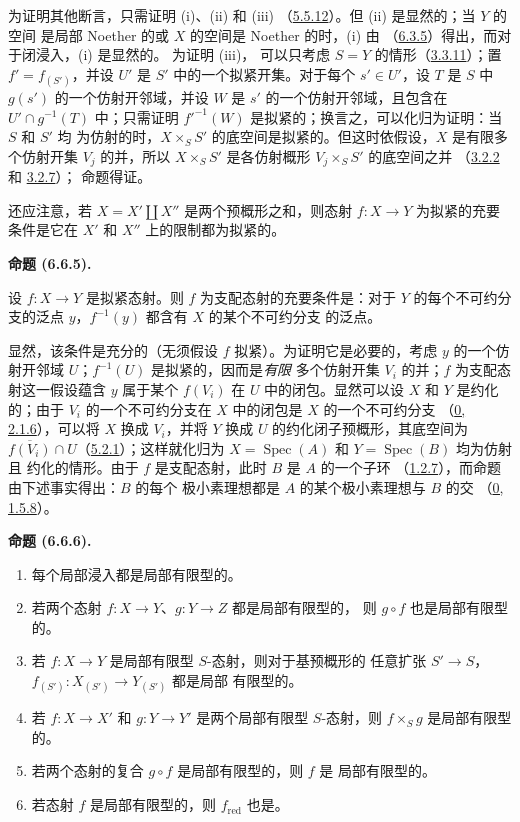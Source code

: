 \documentclass[UTF8,fontset=none,11pt,oneside,openany]{ctexbook}
\newenvironment{proposition}[1][]{%
  \par\medskip\noindent\textbf{命题 (#1).}\ %
}{\par}
\newcommand{\oldpage}[2][]{%
  \hypertarget{ega-source-page-#1-#2}{}%
  \marginnote{\scriptsize\textbf{#1}~|~#2}\ignorespaces}
\let\EGAOriginalLabel\label
\renewcommand{\label}[1]{\phantomsection\EGAOriginalLabel{#1}}
\begin{document}
为证明其他断言，只需证明 (i)、(ii) 和 (iii)
（\hyperref[I.5.5.12-fr]{5.5.12}）。但 (ii) 是显然的；当 $Y$ 的空间
是局部 Noether 的或 $X$ 的空间是 Noether 的时，(i) 由
（\hyperref[I.6.3.5-fr]{6.3.5}）得出，而对于闭浸入，(i) 是显然的。
为证明 (iii)，
\oldpage[I]{154}
可以只考虑 $S=Y$ 的情形（\hyperref[I.3.3.11-fr]{3.3.11}）；置
$f'=f_{(S')}$，并设 $U'$ 是 $S'$ 中的一个拟紧开集。对于每个
$s'\in U'$，设 $T$ 是 $S$ 中 $g(s')$ 的一个仿射开邻域，并设 $W$
是 $s'$ 的一个仿射开邻域，且包含在 $U'\cap g^{-1}(T)$ 中；只需证明
$f'^{-1}(W)$ 是拟紧的；换言之，可以化归为证明：当 $S$ 和 $S'$ 均
为仿射的时，$X\times_S S'$ 的底空间是拟紧的。但这时依假设，$X$
是有限多个仿射开集 $V_j$ 的并，所以 $X\times_S S'$ 是各仿射概形
$V_j\times_S S'$ 的底空间之并
（\hyperref[I.3.2.2-fr]{3.2.2} 和 \hyperref[I.3.2.7-fr]{3.2.7}）；
命题得证。

还应注意，若 $X=X'\amalg X''$ 是两个预概形之和，则态射 $f:X\to Y$
为拟紧的充要条件是它在 $X'$ 和 $X''$ 上的限制都为拟紧的。

\begin{proposition}[6.6.5]
\label{I.6.6.5-fr}
设 $f:X\to Y$ 是拟紧态射。则 $f$ 为支配态射的充要条件是：对于 $Y$
的每个不可约分支的泛点 $y$，$f^{-1}(y)$ 都含有 $X$ 的某个不可约分支
的泛点。
\end{proposition}

显然，该条件是充分的（无须假设 $f$ 拟紧）。为证明它是必要的，考虑
$y$ 的一个仿射开邻域 $U$；$f^{-1}(U)$ 是拟紧的，因而是\emph{有限}
多个仿射开集 $V_i$ 的并；$f$ 为支配态射这一假设蕴含 $y$ 属于某个
$f(V_i)$ 在 $U$ 中的闭包。显然可以设 $X$ 和 $Y$ 是约化的；由于
$V_i$ 的一个不可约分支在 $X$ 中的闭包是 $X$ 的一个不可约分支
（\hyperref[0.2.1.6-fr]{0, 2.1.6}），可以将 $X$ 换成 $V_i$，并将 $Y$
换成 $U$ 的约化闭子预概形，其底空间为
$\overline{f(V_i)}\cap U$（\hyperref[I.5.2.1-fr]{5.2.1}）；这样就化归为
$X=\operatorname{Spec}(A)$ 和 $Y=\operatorname{Spec}(B)$ 均为仿射且
约化的情形。由于 $f$ 是支配态射，此时 $B$ 是 $A$ 的一个子环
（\hyperref[I.1.2.7-fr]{1.2.7}），而命题由下述事实得出：$B$ 的每个
极小素理想都是 $A$ 的某个极小素理想与 $B$ 的交
（\hyperref[0.1.5.8-fr]{0, 1.5.8}）。

\begin{proposition}[6.6.6]
\label{I.6.6.6-fr}
\begin{enumerate}
  \item[(i)] 每个局部浸入都是局部有限型的。
  \item[(ii)] 若两个态射 $f:X\to Y$、$g:Y\to Z$ 都是局部有限型的，
    则 $g\circ f$ 也是局部有限型的。
  \item[(iii)] 若 $f:X\to Y$ 是局部有限型 $S$-态射，则对于基预概形的
    任意扩张 $S'\to S$，$f_{(S')}:X_{(S')}\to Y_{(S')}$ 都是局部
    有限型的。
  \item[(iv)] 若 $f:X\to X'$ 和 $g:Y\to Y'$ 是两个局部有限型
    $S$-态射，则 $f\times_S g$ 是局部有限型的。
  \item[(v)] 若两个态射的复合 $g\circ f$ 是局部有限型的，则 $f$ 是
    局部有限型的。
  \item[(vi)] 若态射 $f$ 是局部有限型的，则 $f_{\mathrm{red}}$ 也是。
\end{enumerate}
\end{proposition}
\end{document}
